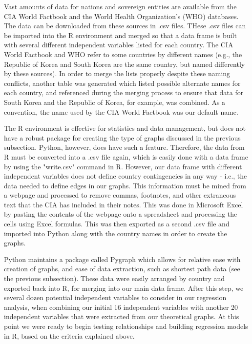 \documentclass[oneside,12pt]{report}
\begin{document}
Vast amounts of data for nations and sovereign entities are available from the CIA World Factbook and the World Health Organization's (WHO) databases. The data can be downloaded from these sources in .csv files. THese .csv files can be imported into the R environment and merged so that a data frame is built with several different independent variables listed for each country. The CIA World Factbook and WHO refer to some countries by different names (e.g., the Republic of Korea and South Korea are the same country, but named differently by these sources). In order to merge the lists properly despite these naming conflicts, another table was generated which listed possible alternate names for each country, and referenced during the merging process to ensure that data for South Korea and the Republic of Korea, for example, was combined. As a convention, the name used by the CIA World Factbook was our default name.

The R environment is effective for statistics and data management, but does not have a robust package for creating the type of graphs discussed in the previous subsection. Python, however, does have such a feature. Therefore, the data from R must be converted into a .csv file again, which is easily done with a data frame by using the "write.csv" command in R. However, our data frame with different independent variables does not define country contingencies in any way - i.e., the data needed to define edges in our graphs. This information must be mined from a webpage and processed to remove commas, footnotes, and other extraneous text that the CIA has included in their notes. This was done in Microsoft Excel by pasting the contents of the webpage onto a spreadsheet and processing the cells using Excel formulas. This was then exported as a second .csv file and imported into Python along with the country names in order to create the graphs.

Python maintains a package called Pygraph which allows for relative ease with creation of graphs, and ease of data extraction, such as shortest path data (see the previous subsection). These data were easily arranged by country and exported back into R, for merging into our main data frame. After this step, we several dozen potential independent variables to consider in our regression analysis, when combining our initial 16 independent variables with another 20 independent variables that were extracted from our theoretical graphs. At this point we were ready to begin testing relationships and building regression models in R, based on the criteria explained above.
\end{document}
